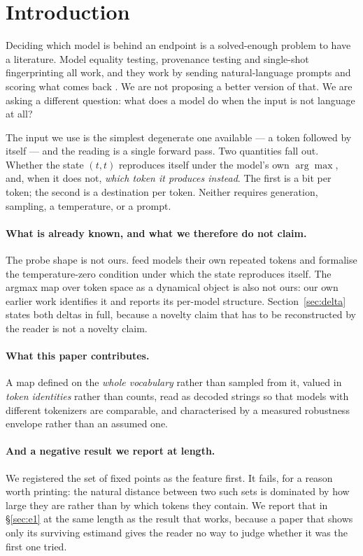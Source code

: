 \documentclass[11pt]{article}
\newcommand{\diag}{(t,t)}
\begin{document}
\section{Introduction}\label{sec:intro}

Deciding which model is behind an endpoint is a solved-enough problem to have a literature. Model
equality testing, provenance testing and single-shot fingerprinting all work, and they work by
sending natural-language prompts and scoring what comes back
\citep{mpt2025,stemma2026,onetoken2026}. We are not proposing a better version of that. We are asking
a different question: what does a model do when the input is not language at all?

The input we use is the simplest degenerate one available --- a token followed by itself --- and the
reading is a single forward pass. Two quantities fall out. Whether the state $\diag$ reproduces
itself under the model's own $\arg\max$, and, when it does not, \emph{which token it produces
instead}. The first is a bit per token; the second is a destination per token. Neither requires
generation, sampling, a temperature, or a prompt.

\paragraph{What is already known, and what we therefore do not claim.} The probe shape is not ours.
\citet{hammouri2025nonhalting} feed models their own repeated tokens and formalise the
temperature-zero condition under which the state reproduces itself. The argmax map over token space
as a dynamical object is also not ours: our own earlier work \citep{veraz2026probes} identifies it and
reports its per-model structure. Section~\ref{sec:delta} states both deltas in full, because a
novelty claim that has to be reconstructed by the reader is not a novelty claim.

\paragraph{What this paper contributes.} A map defined on the \emph{whole vocabulary} rather than
sampled from it, valued in \emph{token identities} rather than counts, read as decoded strings so
that models with different tokenizers are comparable, and characterised by a measured robustness
envelope rather than an assumed one.

\paragraph{And a negative result we report at length.} We registered the set of fixed points as the
feature first. It fails, for a reason worth printing: the natural distance between two such sets is
dominated by how large they are rather than by which tokens they contain. We report that in
\S\ref{sec:e1} at the same length as the result that works, because a paper that shows only its
surviving estimand gives the reader no way to judge whether it was the first one tried.
\end{document}
